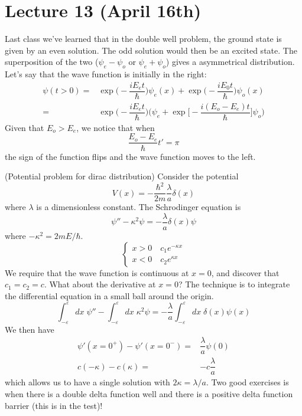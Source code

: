 \section{Lecture 13 (April 16th)}
\begin{thm}
Last class we've learned that in the double well problem, the ground state is given by an even solution. The odd solution would then be an excited state. The superposition of the two ($\psi _{e}-\psi _{o}$ or $\psi _{e}+\psi _{o}$) gives a asymmetrical distribution. Let's say that the wave function is initially in the right:
\begin{align*}
\psi (t>0)=&\exp \Big(-\dfrac{iE_{e}t}{\hbar }\Big)\psi _{e}(x)+\exp \Big(-\dfrac{iE_0t}{\hbar }\Big)\psi _{o}(x)\\
=&\exp \Big(-\dfrac{iE_{e}t}{\hbar }\Big)\Big(\psi _{e}+\exp \Big[-\dfrac{i(E_{o}-E_{e})t}{\hbar }\Big]\psi _{o}\Big)
\end{align*}
Given that $E_{o}>E_{e}$, we notice that when
\[\dfrac{E_{o}-E_{e}}{\hbar }t'=\pi \]
the sign of the function flips and the wave function moves to the left.
\end{thm}
\vspace{2ex}
\begin{thm}
(Potential problem for dirac distribution) Consider the potential
\[V(x)=-\dfrac{\hbar ^2}{2m}\dfrac{\lambda }{a}\delta (x)\]
where $\lambda $ is a dimensionless constant. The Schrodinger equation is
\[\psi ''-\kappa ^2\psi =-\dfrac{\lambda }{a}\delta (x)\psi \]
where $-\kappa^2=2mE/\hbar  $.
\[\begin{cases}
x>0\quad c_1e^{-\kappa x}\\
x<0\quad c_2e^{\kappa x}
\end{cases}\]
We require that the wave function is continuous at $x=0$, and discover that $c_1=c_2=c$. What about the derivative at $x=0$? The technique is to integrate the differential equation in a small ball around the origin.
\[\int ^{\varepsilon }_{-\varepsilon }dx\;\psi ''-\int ^{\varepsilon }_{-\varepsilon }dx\;\kappa ^2\psi =-\dfrac{\lambda }{a}\int ^{\varepsilon }_{-\varepsilon }dx\;\delta (x)\psi (x)\]
We then have
\begin{align*}
\psi '(x=0^{+})-\psi '(x=0^{-})=&\dfrac{\lambda }{a}\psi (0)\\
c(-\kappa )-c(\kappa )=&-c\dfrac{\lambda }{a}
\end{align*}
which allows us to have a single solution with $2\kappa =\lambda /a$. Two good exercises is when there is a double delta function well and there is a positive delta function barrier (this is in the test)!
\end{thm}
